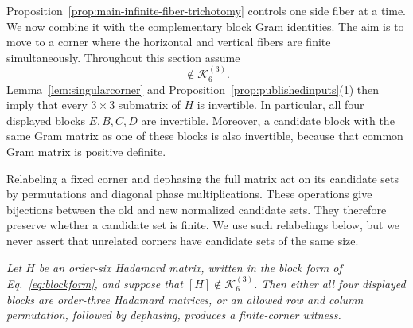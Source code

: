\documentclass[aps,prx,reprint,nofootinbib,twoside,superscriptaddress,longbibliography,floatfix]{revtex4-2}
\theoremstyle{definition}
\newcommand{\KK}{\mathcal K}
\begin{document}
{Proposition~\ref{prop:main-infinite-fiber-trichotomy} controls one side fiber at a time. We now combine it with the complementary block Gram identities. The aim is to move to a corner where the horizontal and vertical fibers are finite simultaneously.} Throughout this section assume
\begin{equation}
[H]\notin\KK_6^{(3)}.
\label{eq:outsideK}
\end{equation}
Lemma~\ref{lem:singularcorner} and Proposition~\ref{prop:publishedinputs}(1) then imply that every $3\times3$ submatrix of $H$ is invertible.  In particular, all four displayed blocks $E,B,C,D$ are invertible.  Moreover, a candidate block with the same Gram matrix as one of these blocks is also invertible, because that common Gram matrix is positive definite.

Relabeling a fixed corner and dephasing the full matrix act on its candidate sets by permutations and diagonal phase multiplications.  These operations give bijections between the old and new normalized candidate sets.  They therefore preserve whether a candidate set is finite.  We use such relabelings below, but we never assert that unrelated corners have candidate sets of the same size.

{\emph{Let $H$ be an order-six Hadamard matrix, written in the block form of Eq.~\eqref{eq:blockform}, and suppose that $[H]\notin\KK_6^{(3)}$. Then either all four displayed blocks are order-three Hadamard matrices, or an allowed row and column permutation, followed by dephasing, produces a finite-corner witness.}}
\end{document}
